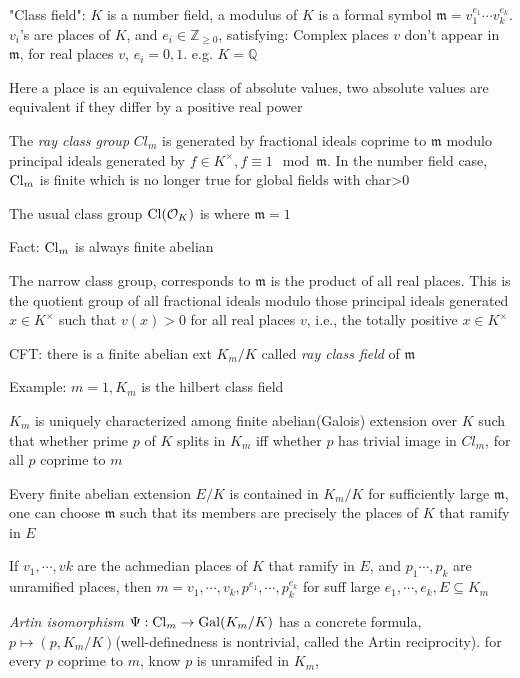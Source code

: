 \documentclass[main]{subfiles}
\begin{document}
"Class field": $K$ is a number field, a modulus of $K$ is a formal symbol $\mathfrak m=v_1^{e_1}\cdots v_k^{e_k}$. $v_i$'s are places of $K$, and $e_i\in\mathbb Z_{\geq0}$, satisfying: Complex places $v$ don't appear in $\mathfrak m$, for real places $v$, $e_i=0,1$. e.g. $K=\mathbb Q$

Here a place is an equivalence class of absolute values, two absolute values are equivalent if they differ by a positive real power

The \textit{ray class group} $Cl_m$ is generated by fractional ideals coprime to $\mathfrak m$ modulo principal ideals generated by $f\in K^\times, f\equiv1\mod \mathfrak m$. In the number field case, $\operatorname{Cl}_m$ is finite which is no longer true for global fields with char>0

The usual class group $\operatorname{Cl}(\mathcal O_K)$ is where $\mathfrak m=1$

Fact: $\operatorname{Cl}_m$ is always finite abelian

The narrow class group, corresponds to $\mathfrak m$ is the product of all real places. This is the quotient group of all fractional ideals modulo those principal ideals generated $x \in K^\times$ such that $v(x) > 0$ for all real places $v$, i.e., the totally positive $x \in K^\times$

CFT: there is a finite abelian ext $K_m/K$ called \textit{ray class field} of $\mathfrak m$

Example: $m=1, K_m$ is the hilbert class field

$K_m$ is uniquely characterized among finite abelian(Galois) extension over $K$ such that whether prime $p$ of $K$ splits in $K_m$ iff whether $p$ has trivial image in $Cl_m$, for all $p$ coprime to $m$

\begin{theorem}
Every finite abelian extension $E/K$ is contained in $K_m/K$ for sufficiently large $\mathfrak m$, one can choose $\mathfrak m$ such that its members are precisely the places of $K$ that ramify in $E$
\end{theorem}

\begin{example}
If $v_1,\cdots,vk$ are the achmedian places of $K$ that ramify in $E$, and $p_1\cdots,p_k$ are unramified places, then $m=v_1,\cdots,v_k,p^{e_1},\cdots,p_k^{e_k}$ for suff large $e_1,\cdots,e_k, E\subseteq K_m$
\end{example}

\textit{Artin isomorphism} $\Psi:\operatorname{Cl}_m\to \operatorname{Gal}(K_m/K)$ has a concrete formula, $p\mapsto (p,K_m/K)$(well-definedness is nontrivial, called the Artin reciprocity). for every $p$ coprime to $m$, know $p$ is unramifed in $K_m$, 
\end{document}
